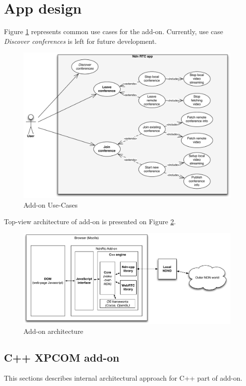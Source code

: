 \documentclass[12pt]{article}
\begin{document}
\section{App design}
Figure \ref{fig:uc} represents common use cases for the add-on. Currently, use case \textit{Discover conferences} is left for future development.
\begin{figure}
\centering
\includegraphics[width=\textwidth]{../res/graphics/addon-uc}
\caption{Add-on Use-Cases}
\label{fig:uc}
\end{figure}


Top-view architecture of add-on is presented on Figure \ref{fig:arch}.
\begin{figure}
\centering
\includegraphics[width=\textwidth]{../res/graphics/addon-arch}
\caption{Add-on architecture}
\label{fig:arch}
\end{figure}

\subsection{C++ XPCOM add-on}
This sections describes internal architectural approach for C++ part of add-on.
\end{document}
